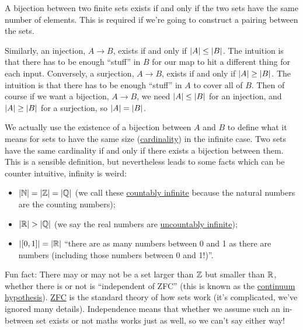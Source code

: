 \documentclass[fleqn]{LectureClass/LectureClass}
\begin{document}
    \begin{remark}{}{}
        A bijection between two finite sets exists if and only if the two sets have the same number of elements.
        This is required if we're going to construct a pairing between the sets.
        
        Similarly, an injection, \(A \to B\), exists if and only if \(\lvert A\rvert \le \lvert B\rvert\).
        The intuition is that there has to be enough \enquote{stuff} in \(B\) for our map to hit a different thing for each input.
        Conversely, a surjection, \(A \to B\), exists if and only if \(\lvert A\rvert \ge \lvert B\rvert\).
        The intuition is that there has to be enough \enquote{stuff} in \(A\) to cover all of \(B\).
        Then of course if we want a bijection, \(A \to B\), we need \(\lvert A\rvert \le \lvert B\rvert\) for an injection, and \(\lvert A\rvert \ge \lvert B\rvert\) for a surjection, so \(\lvert A\rvert = \lvert B\rvert\).
        
        We actually use the existence of a bijection between \(A\) and \(B\) to define what it means for sets to have the same size (\href{https://en.wikipedia.org/wiki/Cardinality}{cardinality}) in the infinite case.
        Two sets have the same cardinality if and only if there exists a bijection between them.
        This is a sensible definition, but nevertheless leads to some facts which can be counter intuitive, infinity is weird:
        \begin{itemize}
            \item \(\lvert\mathbb{N}\rvert = \lvert\mathbb{Z}\rvert = \lvert\mathbb{Q}\rvert\) (we call these \href{https://en.wikipedia.org/wiki/Cardinality#Countable_sets}{countably infinite} because the natural numbers are the counting numbers);
            \item \(\lvert\mathbb{R}\rvert > \lvert\mathbb{Q}\rvert\) (we say the real numbers are \href{https://en.wikipedia.org/wiki/Cardinality#Uncountable_sets}{uncountably infinite});
            \item \(\lvert[0, 1]\rvert = \lvert\mathbb{R}\rvert\) \enquote{there are as many numbers between 0 and 1 as there are numbers (including those numbers between 0 and 1!)}.
        \end{itemize}
        
        Fun fact: There may or may not be a set larger than \(\mathbb{Z}\) but smaller than \(\mathbb{R}\), whether there is or not is \enquote{independent of ZFC} (this is known as the \href{https://en.wikipedia.org/wiki/Continuum_hypothesis}{continuum hypothesis}).
        \href{https://en.wikipedia.org/wiki/Zermelo%E2%80%93Fraenkel_set_theory}{ZFC} is the standard theory of how sets work (it's complicated, we've ignored many details).
        Independence means that whether we assume such an in-between set exists or not maths works just as well, so we can't say either way!
    \end{remark}
    
\end{document}
